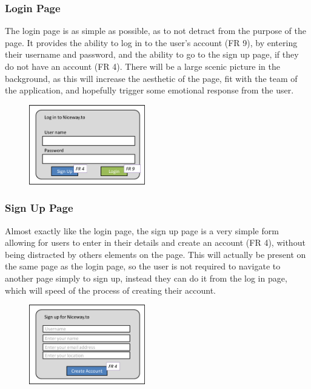 \subsubsection{Login Page}
The login page is as simple as possible, as to not detract from the purpose of the page. It provides the ability to log in to the user's account (FR 9), by entering their username and password, and the ability to go to the sign up page, if they do not have an account (FR 4). There will be a large scenic picture in the background, as this will increase the aesthetic of the page, fit with the team of the application, and hopefully trigger some emotional response from the user.
\begin{figure}[!ht]
	\begin{center}
		\includegraphics[width=0.45\textwidth]{images/ui-login.png}
	\end{center}
	\vspace{-6mm}
\end{figure}

\subsubsection{Sign Up Page}
Almost exactly like the login page, the sign up page is a very simple form allowing for users to enter in their details and create an account (FR 4), without being distracted by others elements on the page. This will actually be present on the same page as the login page, so the user is not required to navigate to another page simply to sign up, instead they can do it from the log in page, which will speed of the process of creating their account.
\begin{figure}[!ht]
	\begin{center}
		\includegraphics[width=0.45\textwidth]{images/ui-signup.png}
	\end{center}
	\vspace{-6mm}
\end{figure}

